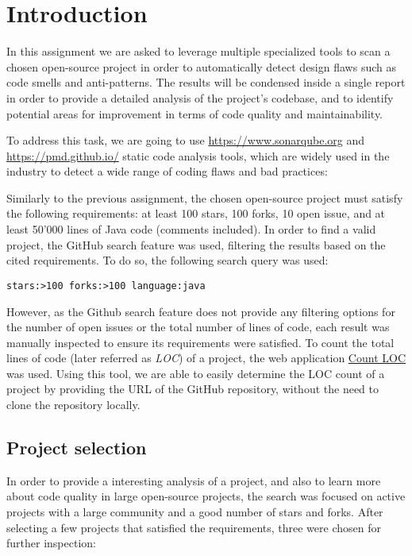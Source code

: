 \section{Introduction}

In this assignment we are asked to leverage multiple specialized tools to scan a chosen open-source project in order to automatically detect design flaws such as code smells and anti-patterns. The results will be condensed inside a single report in order to provide a detailed analysis of the project's codebase, and to identify potential areas for improvement in terms of code quality and maintainability.

To address this task, we are going to use \href{SonarQube}{https://www.sonarqube.org} and \href{PMD}{https://pmd.github.io/} static code analysis tools, which are widely used in the industry to detect a wide range of coding flaws and bad practices:

Similarly to the previous assignment, the chosen open-source project must satisfy the following requirements: at least 100 stars, 100 forks, 10 open issue, and at least 50'000 lines of Java code (comments included). In order to find a valid project, the GitHub search feature was used, filtering the results based on the cited requirements. To do so, the following search query was used:

\begin{lstlisting}[caption=GitHub search query]
                    stars:>100 forks:>100 language:java
\end{lstlisting}

\noindent However, as the Github search feature does not provide any filtering options for the number of open issues or the total number of lines of code, each result was manually inspected to ensure its requirements were satisfied. To count the total lines of code (later referred as \emph{LOC}) of a project, the web application \href{https://codetabs.com/count-loc/count-loc-online.html}{Count LOC} was used. Using this tool, we are able to easily determine the LOC count of a project by providing the URL of the GitHub repository, without the need to clone the repository locally.

\subsection{Project selection}

In order to provide a interesting analysis of a project, and also to learn more about code quality in large open-source projects, the search was focused on active projects with a large community and a good number of stars and forks. After selecting a few projects that satisfied the requirements, three were chosen for further inspection:


